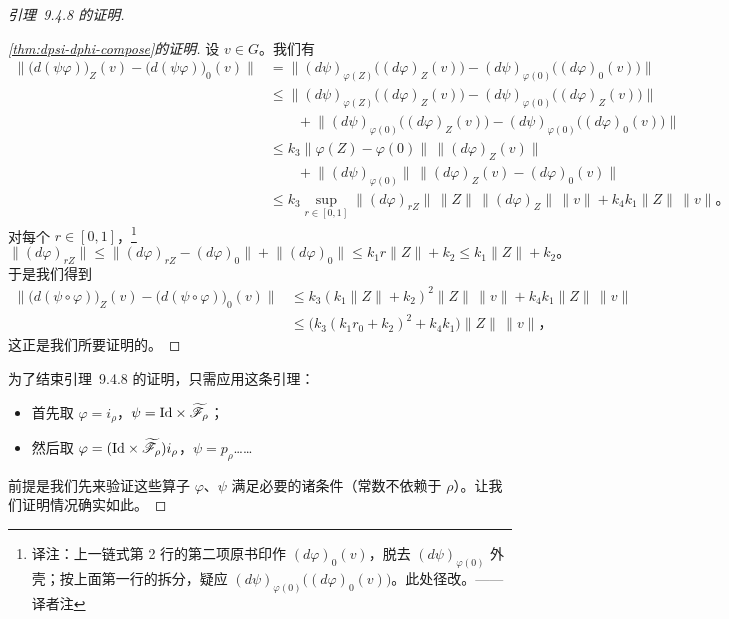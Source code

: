 \begin{proof}[引理~9.4.8 的证明]
\begin{proof}[\cref{thm:dpsi-dphi-compose}的证明]
设 $v\in G$。我们有
\[
\begin{aligned}
\bigl\|\bigl(d(\psi\varphi)\bigr)_{Z}(v)-\bigl(d(\psi\varphi)\bigr)_{0}(v)\bigr\|&=\bigl\|(d\psi)_{\varphi(Z)}\bigl((d\varphi)_{Z}(v)\bigr)-(d\psi)_{\varphi(0)}\bigl((d\varphi)_{0}(v)\bigr)\bigr\|\\
&\le\bigl\|(d\psi)_{\varphi(Z)}\bigl((d\varphi)_{Z}(v)\bigr)-(d\psi)_{\varphi(0)}\bigl((d\varphi)_{Z}(v)\bigr)\bigr\|\\
&\qquad+\bigl\|(d\psi)_{\varphi(0)}\bigl((d\varphi)_{Z}(v)\bigr)-(d\psi)_{\varphi(0)}\bigl((d\varphi)_{0}(v)\bigr)\bigr\|\\
&\le k_{3}\|\varphi(Z)-\varphi(0)\|\,\bigl\|(d\varphi)_{Z}(v)\bigr\|\\
&\qquad+\bigl\|(d\psi)_{\varphi(0)}\bigr\|\,\bigl\|(d\varphi)_{Z}(v)-(d\varphi)_{0}(v)\bigr\|\\
&\le k_{3}\sup_{r\in[0,1]}\bigl\|(d\varphi)_{rZ}\bigr\|\,\|Z\|\,\bigl\|(d\varphi)_{Z}\bigr\|\,\|v\|+k_{4}k_{1}\|Z\|\,\|v\|\text{。}
\end{aligned}
\]
对每个 $r\in[0,1]$，\footnote{译注：上一链式第 2 行的第二项原书印作 $(d\varphi)_{0}(v)$，脱去 $(d\psi)_{\varphi(0)}$ 外壳；按上面第一行的拆分，疑应 $(d\psi)_{\varphi(0)}\bigl((d\varphi)_{0}(v)\bigr)$。此处径改。——译者注}
\[
\bigl\|(d\varphi)_{rZ}\bigr\|\le\bigl\|(d\varphi)_{rZ}-(d\varphi)_{0}\bigr\|+\bigl\|(d\varphi)_{0}\bigr\|
\le k_{1}r\|Z\|+k_{2}\le k_{1}\|Z\|+k_{2}\text{。}
\]
于是我们得到
\[
\begin{aligned}
\bigl\|\bigl(d(\psi\circ\varphi)\bigr)_{Z}(v)-\bigl(d(\psi\circ\varphi)\bigr)_{0}(v)\bigr\|&\le k_{3}(k_{1}\|Z\|+k_{2})^{2}\|Z\|\,\|v\|+k_{4}k_{1}\|Z\|\,\|v\|\\
&\le\bigl(k_{3}(k_{1}r_{0}+k_{2})^{2}+k_{4}k_{1}\bigr)\|Z\|\,\|v\|\text{，}
\end{aligned}
\]
这正是我们所要证明的。
\end{proof}

为了结束引理~9.4.8 的证明，只需应用这条引理：
\begin{itemize}
\item 首先取 $\varphi=i_{\rho}$，$\psi=\mathrm{Id}\times\widetilde{\mathscr{F}}_{\rho}$；
\item 然后取 $\varphi=(\mathrm{Id}\times\widetilde{\mathscr{F}}_{\rho})i_{\rho}$，$\psi=p_{\rho}$……
\end{itemize}
前提是我们先来验证这些算子 $\varphi$、$\psi$ 满足必要的诸条件（常数不依赖于 $\rho$）。让我们证明情况确实如此。


\end{proof}
